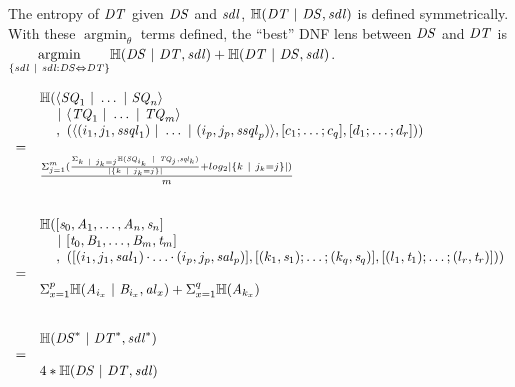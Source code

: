 \documentclass[acmsmall,screen,anonymous]{acmart}
\begin{document}
The entropy of $\mathit{DT}$ given $\mathit{DS}$ and $\mathit{sdl}$,
$\mathbb{H}(\mathit{DT} ~|~ \mathit{DS},\mathit{sdl})$ is defined symmetrically.
With these $\operatorname*{argmin}_\theta$ terms defined, the ``best'' DNF lens
between $\mathit{DS}$ and $\mathit{DT}$ is $\underset{\{\mathit{sdl} ~|~
    \mathit{sdl} : \mathit{DS} \Leftrightarrow \mathit{DT}\}}{\text{argmin}}
\mathbb{H}(\mathit{DS} ~|~ \mathit{DT},\mathit{sdl}) + \mathbb{H}(\mathit{DT}
  ~|~ \mathit{DS},\mathit{sdl})$.
\begin{centering}
  \[
    \begin{array}{rl}
      & \mathbb{H}(\langle\mathit{SQ}_1 ~|~ \ldots ~|~ \mathit{SQ}_n\rangle\\
      & \hspace*{1em}~|~
        \langle\mathit{TQ}_1 ~|~ \ldots ~|~ \mathit{TQ}_m\rangle\\
      & \hspace*{1.21em},~(\langle(i_1,j_1,\mathit{ssql}_1)~|~
        \ldots~|~
        (i_p,j_p,\mathit{ssql}_p)\rangle
        ,[ c_1;\ldots;c_q ]
        ,[ d_1;\ldots;d_r ]))\\
      =\\
      & \frac{\Sigma_{j=1}^m(\frac{\Sigma_{k~|~ j_k = j}
        \mathbb{H}(\mathit{SQ}_{i_k}~|~\mathit{TQ}_j,\mathit{sql}_k)}{|\{k~|~
        j_k = j\}|} + log_2|\{k~|~ j_k = j\}|)}{m}\\\\
      \\
      
      & \mathbb{H}(
        [\mathit{s}_0,\mathit{A}_1,\ldots,\mathit{A}_n,\mathit{s}_n]\\
      & \hspace*{1em}~|~
        [\mathit{t}_0,\mathit{B}_1,\ldots,\mathit{B}_m,\mathit{t}_m]\\
      & \hspace*{1.21em},~
        ([(i_1,j_1,\mathit{sal}_1)\mkern-1mu\cdot\mkern-1mu
        \ldots\mkern-1mu\cdot\mkern-1mu
        (i_p,j_p,\mathit{sal}_p)]
        ,[ (k_1,\mathit{s}_1);\ldots;(k_q,\mathit{s}_q) ]
        ,[ (l_1,\mathit{t}_1);\ldots;(l_r,\mathit{t}_r) ]))\\
      =\\
      & \Sigma_{x=1}^p\mathbb{H}(\mathit{A}_{i_x} ~|~ \mathit{B}_{i_x},\mathit{al}_x) +
        \Sigma_{x=1}^q\mathbb{H}(\mathit{A}_{k_x})\\\\
      \\
      
      
      & \mathbb{H}({\mathit{DS}}^* ~|~ {\mathit{DT}}^*,{\mathit{sdl}}^*)\\
      =\\
      & 4*\mathbb{H}(\mathit{DS}~|~\mathit{DT},\mathit{sdl})
    \end{array}
  \]
\end{centering}
\end{document}
